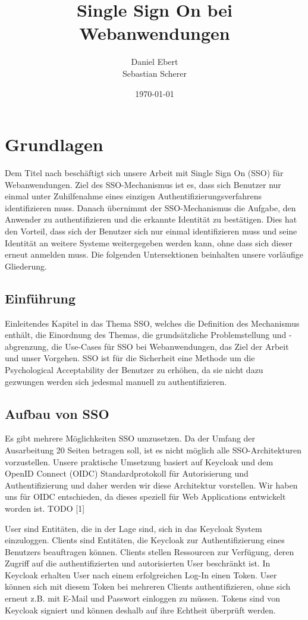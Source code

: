 \documentclass[12pt]{article}
\title{Single Sign On bei Webanwendungen}
\author{Daniel Ebert \\
	Sebastian Scherer}
\date{\today}
\begin{document}
\maketitle
	
\section{Grundlagen}
Dem Titel nach beschäftigt sich unsere Arbeit mit Single Sign On (SSO) für Webanwendungen.
Ziel des SSO-Mechanismus ist es, dass sich Benutzer nur einmal unter Zuhilfenahme eines einzigen Authentifizierungsverfahrens identifizieren muss.
Danach übernimmt der SSO-Mechanismus die Aufgabe, den Anwender zu authentifizieren und die erkannte Identität zu bestätigen. Dies hat den Vorteil, dass sich der Benutzer sich nur einmal identifizieren muss und seine Identität an weitere Systeme weitergegeben werden kann, ohne dass sich dieser erneut anmelden muss.
Die folgenden Untersektionen beinhalten unsere vorläufige Gliederung.

\subsection{Einführung}	
Einleitendes Kapitel in das Thema SSO, welches die Definition des Mechanismus enthält, die Einordnung des Themas, die grundsätzliche Problemstellung und -abgrenzung, die Use-Cases für SSO bei Webanwendungen, das Ziel der Arbeit und unser Vorgehen. SSO ist für die Sicherheit eine Methode um die Psychological Acceptability der Benutzer zu erhöhen, da sie nicht dazu gezwungen werden sich jedesmal manuell zu authentifizieren.
	
\subsection{Aufbau von SSO}	
Es gibt mehrere Möglichkeiten SSO umzusetzen. Da der Umfang der Ausarbeitung 20 Seiten betragen soll, ist es nicht möglich alle SSO-Architekturen vorzustellen. Unsere praktische Umsetzung basiert auf Keycloak und dem OpenID Connect (OIDC) Standardprotokoll für Autorisierung und Authentifizierung und daher werden wir diese Architektur vorstellen. Wir haben uns für OIDC entschieden, da dieses speziell für Web Applications entwickelt worden ist. TODO [1]

User sind Entitäten, die in der Lage sind, sich in das Keycloak System einzuloggen. Clients sind Entitäten, die Keycloak zur Authentifizierung eines Benutzers beauftragen können. Clients stellen Ressourcen zur Verfügung, deren Zugriff auf die authentifizierten und autorisierten User beschränkt ist. In Keycloak erhalten User nach einem erfolgreichen Log-In einen Token. User können sich mit diesem Token bei mehreren Clients authentifizieren, ohne sich erneut z.B. mit E-Mail und Passwort einloggen zu müssen. Tokens sind von Keycloak signiert und können deshalb auf ihre Echtheit überprüft werden.
\end{document}

